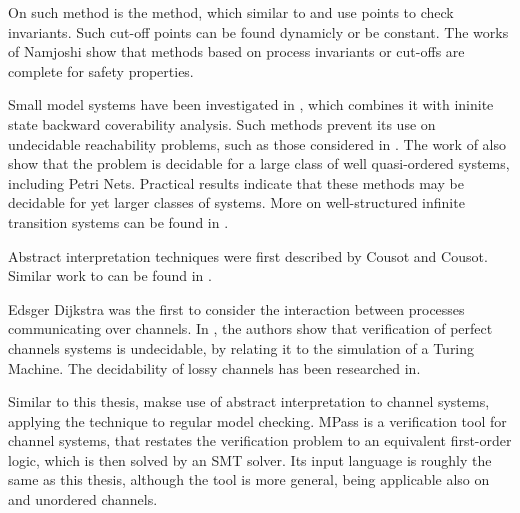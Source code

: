 On such method is the  method\cite{invinv}, which similar to \cite{parosh} and \cite{namjoshi} use  points to check invariants. Such cut-off points can be found dynamicly\cite{kaiser2010} or be constant\cite{emerson1995}. The works of Namjoshi\cite{namjoshi}  show that methods based on process invariants or cut-offs are complete for safety properties.

Small model systems have been investigated in \cite{kaiser2010}, which combines it with ininite state backward coverability analysis. Such methods prevent its use on undecidable reachability problems, such as those considered in \cite{parosh}. The work of \cite{parosh} also show that the problem is decidable for a large class of well quasi-ordered systems, including Petri Nets\cite{parosh}. Practical results indicate that these methods may be decidable for yet larger classes of systems. More on well-structured infinite transition systems can be found in \cite{finkel2001}.

Abstract interpretation techniques were first described by Cousot and Cousot\cite{cousot1977}\cite{cousot1979}. Similar work to \cite{parosh} can be found in \cite{raskin2006, ganty2006}.

Edsger Dijkstra was the first to consider the interaction between processes communicating over channels\cite{dijkstra1972}\cite{baier2008}. In \cite{bz83}, the authors show that verification of perfect channels systems is undecidable, by relating it to the simulation of a Turing Machine\cite{bz83}. The decidability of lossy channels has been researched in\cite{287591, gordon}.


Similar to this thesis, \cite{le2006} makse use of abstract interpretation to channel systems, applying the technique to regular model checking. MPass\cite{mpass} is a verification tool for channel systems, that restates the verification problem to an equivalent first-order logic, which is then solved by an SMT solver. Its input language is roughly the same as this thesis, although the tool is more general, being applicable also on  and unordered channels.

